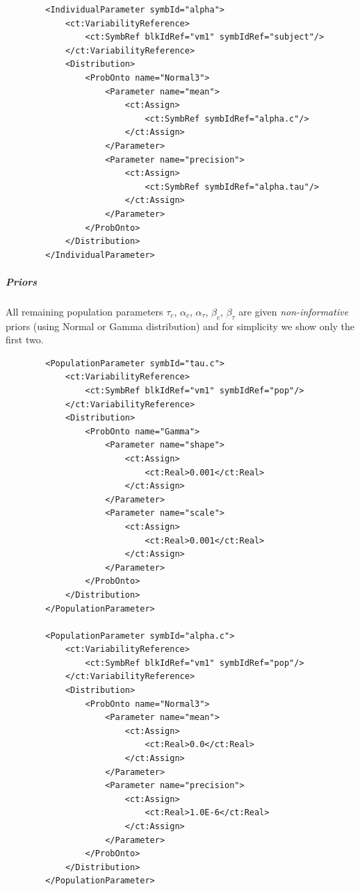 \lstset{language=XML}
\begin{lstlisting}
        <IndividualParameter symbId="alpha">
            <ct:VariabilityReference>
                <ct:SymbRef blkIdRef="vm1" symbIdRef="subject"/>
            </ct:VariabilityReference>
            <Distribution>
                <ProbOnto name="Normal3">
                    <Parameter name="mean">
                        <ct:Assign>
                            <ct:SymbRef symbIdRef="alpha.c"/>
                        </ct:Assign>
                    </Parameter>
                    <Parameter name="precision">
                        <ct:Assign>
                            <ct:SymbRef symbIdRef="alpha.tau"/>
                        </ct:Assign>
                    </Parameter>
                </ProbOnto>
            </Distribution>
        </IndividualParameter>
\end{lstlisting}
\subparagraph{Priors} All remaining population parameters $\tau_c$, $\alpha_c$, 
$\alpha_{\tau}$, $\beta_c$, $\beta_{\tau}$ are given \emph{non-informative} 
priors (using Normal or Gamma distribution) and for simplicity we show only the first two.
\lstset{language=XML}
\begin{lstlisting}
        <PopulationParameter symbId="tau.c">
            <ct:VariabilityReference>
                <ct:SymbRef blkIdRef="vm1" symbIdRef="pop"/>
            </ct:VariabilityReference>
            <Distribution>
                <ProbOnto name="Gamma">
                    <Parameter name="shape">
                        <ct:Assign>
                            <ct:Real>0.001</ct:Real>
                        </ct:Assign>
                    </Parameter>
                    <Parameter name="scale">
                        <ct:Assign>
                            <ct:Real>0.001</ct:Real>
                        </ct:Assign>
                    </Parameter>
                </ProbOnto>
            </Distribution>
        </PopulationParameter>
        
        <PopulationParameter symbId="alpha.c">
            <ct:VariabilityReference>
                <ct:SymbRef blkIdRef="vm1" symbIdRef="pop"/>
            </ct:VariabilityReference>
            <Distribution>
                <ProbOnto name="Normal3">
                    <Parameter name="mean">
                        <ct:Assign>
                            <ct:Real>0.0</ct:Real>
                        </ct:Assign>
                    </Parameter>
                    <Parameter name="precision">
                        <ct:Assign>
                            <ct:Real>1.0E-6</ct:Real>
                        </ct:Assign>
                    </Parameter>
                </ProbOnto>
            </Distribution>
        </PopulationParameter>
\end{lstlisting}

